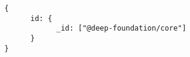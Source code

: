 \begin{lstlisting}
  {
        id: {
              _id: ["@deep-foundation/core"]
        }
  }
\end{lstlisting}